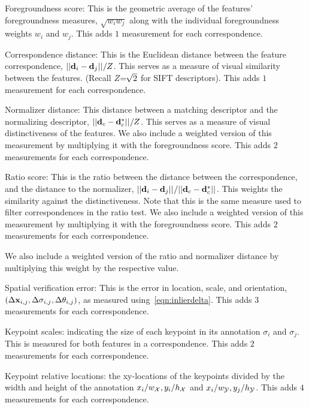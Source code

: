 \begin{itemln}

    \item Foregroundness score:
    This is the geometric average of the features' foregroundness measures, $\sqrt{w_i w_j}$ along with the
      individual foregroundness weights $w_i$ and $w_j$.
    This adds $1$ measurement for each correspondence.

    \item Correspondence distance:
    This is the Euclidean distance between the feature correspondence, $||\mathbf{d}_i - \mathbf{d}_j||_{} / Z$.
    This serves as a measure of visual similarity between the features.
    (Recall $Z\mkern-6mu=\mkern-6mu\sqrt{2}$ for SIFT descriptors).
    This adds $1$ measurement for each correspondence.

    \item Normalizer distance:
    This distance between a matching descriptor and the normalizing descriptor, %
        $||\mathbf{d}_c - \mathbf{d}^{*}_c||_{} / Z$.
        This serves as a measure of visual distinctiveness of the features.
    We also include a weighted version of this measurement by multiplying it with the foregroundness score.
    This adds $2$ measurements for each correspondence.

    \item Ratio score:
    This is the ratio between the distance between the correspondence, and the distance to the normalizer, %
    $||\mathbf{d}_i - \mathbf{d}_j||_{} / ||\mathbf{d}_c - \mathbf{d}^{*}_c||_{}$.
    This weights the similarity against the distinctiveness.
    Note that this is the same measure used to filter correspondences in the ratio test.
    We also include a weighted version of this measurement by multiplying it with the foregroundness score.
    This adds $2$ measurements for each correspondence.

    We also include a weighted version of the ratio and normalizer distance by multiplying this weight by the
      respective value.
        
    \item Spatial verification error: This is the error in location, scale, and orientation, $( %
        \Delta \pt_{i, j}, %
        \Delta \scale_{i, j}, %
        \Delta \ori_{i, j})$, as measured using~\cref{eqn:inlierdelta}.
    This adds $3$ measurements for each correspondence.

    \item Keypoint scales: indicating the size of each keypoint in its annotation $\sigma_i$ and $\sigma_j$.
        This is measured for both features in a correspondence.
    This adds $2$ measurements for each correspondence.

    \item Keypoint relative locations: the xy-locations of the keypoints divided by the width and height of the
      annotation $x_i / w_{\mathcal{X}}, y_i / h_{\mathcal{X}}$ and $x_i / w_{\mathcal{Y}}, y_j / h_{\mathcal{Y}}$.
    This adds $4$ measurements for each correspondence.
\end{itemln}

